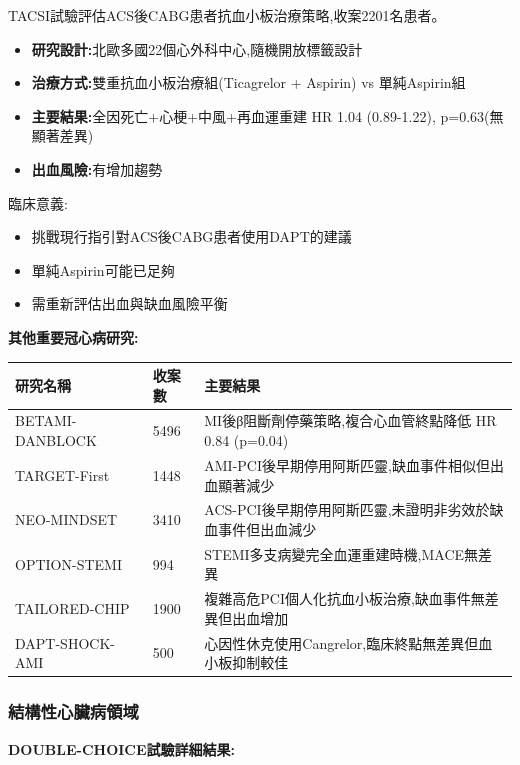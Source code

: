 \documentclass[12pt,a4paper]{article}
\begin{document}
TACSI試驗評估ACS後CABG患者抗血小板治療策略,收案2201名患者。

\begin{itemize}[nosep]
    \item \textbf{研究設計:}北歐多國22個心外科中心,隨機開放標籤設計
    \item \textbf{治療方式:}雙重抗血小板治療組(Ticagrelor + Aspirin) vs 單純Aspirin組
    \item \textbf{主要結果:}全因死亡+心梗+中風+再血運重建 HR 1.04 (0.89-1.22), p=0.63(無顯著差異)
    \item \textbf{出血風險:}有增加趨勢
\end{itemize}

臨床意義:
\begin{itemize}[nosep]
    \item 挑戰現行指引對ACS後CABG患者使用DAPT的建議
    \item 單純Aspirin可能已足夠
    \item 需重新評估出血與缺血風險平衡
\end{itemize}

\vspace{0.5cm}

\textbf{其他重要冠心病研究:}

\begin{longtable}{p{3.5cm}p{2cm}p{8.5cm}}
\toprule
\textbf{研究名稱} & \textbf{收案數} & \textbf{主要結果} \\
\midrule
\endhead
BETAMI-DANBLOCK & 5496 & MI後β阻斷劑停藥策略,複合心血管終點降低 HR 0.84 (p=0.04) \\
TARGET-First & 1448 & AMI-PCI後早期停用阿斯匹靈,缺血事件相似但出血顯著減少 \\
NEO-MINDSET & 3410 & ACS-PCI後早期停用阿斯匹靈,未證明非劣效於缺血事件但出血減少 \\
OPTION-STEMI & 994 & STEMI多支病變完全血運重建時機,MACE無差異 \\
TAILORED-CHIP & 1900 & 複雜高危PCI個人化抗血小板治療,缺血事件無差異但出血增加 \\
DAPT-SHOCK-AMI & 500 & 心因性休克使用Cangrelor,臨床終點無差異但血小板抑制較佳 \\
\bottomrule
\end{longtable}

\subsubsection{結構性心臟病領域}

\textbf{DOUBLE-CHOICE試驗詳細結果:}
\end{document}
